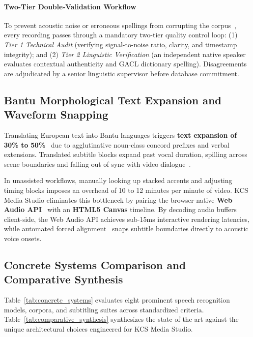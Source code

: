 \documentclass[conference]{IEEEtran}
\begin{document}
\paragraph{Two-Tier Double-Validation Workflow}
To prevent acoustic noise or erroneous spellings from corrupting the corpus~\cite{kobotoolbox2024}, every recording passes through a mandatory two-tier quality control loop: (1) \textit{Tier 1 Technical Audit} (verifying signal-to-noise ratio, clarity, and timestamp integrity); and (2) \textit{Tier 2 Linguistic Verification} (an independent native speaker evaluates contextual authenticity and GACL dictionary spelling). Disagreements are adjudicated by a senior linguistic supervisor before database commitment.

\subsection{Bantu Morphological Text Expansion and Waveform Snapping}
\label{sec:sota:editor}

Translating European text into Bantu languages triggers \textbf{text expansion of 30\% to 50\%}~\cite{tadadjeu1979alphabet} due to agglutinative noun-class concord prefixes and verbal extensions. Translated subtitle blocks expand past vocal duration, spilling across scene boundaries and falling out of sync with video dialogue~\cite{w3c2019webvtt}. 

In unassisted workflows, manually looking up stacked accents and adjusting timing blocks imposes an overhead of 10 to 12 minutes per minute of video. KCS Media Studio eliminates this bottleneck by pairing the browser-native \textbf{Web Audio API}~\cite{w3c2021webaudio} with an \textbf{HTML5 Canvas} timeline. By decoding audio buffers client-side, the Web Audio API achieves sub-15ms interactive rendering latencies, while automated forced alignment~\cite{graves2006connectionist} snaps subtitle boundaries directly to acoustic voice onsets.

\subsection{Concrete Systems Comparison and Comparative Synthesis}
\label{sec:sota:matrix}

Table~\ref{tab:concrete_systems} evaluates eight prominent speech recognition models, corpora, and subtitling suites across standardized criteria. Table~\ref{tab:comparative_synthesis} synthesizes the state of the art against the unique architectural choices engineered for KCS Media Studio.
\end{document}
